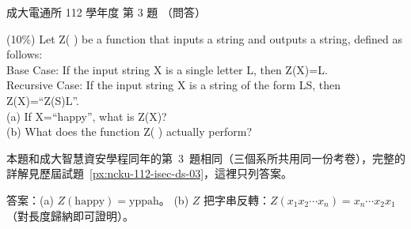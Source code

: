 \begin{pastexam}[label={px:ncku-112-cce-ds-03}]{成大電通所 112 學年度 第 3 題}
（問答）

(10\%) Let Z( ) be a function that inputs a string and outputs a string, defined as follows:\\
\hspace*{2em}Base Case: If the input string X is a single letter L, then Z(X)=L.\\
\hspace*{2em}Recursive Case: If the input string X is a string of the form LS, then Z(X)=``Z(S)L''.\\
\hspace*{2em}(a) If X=``happy'', what is Z(X)?\\
\hspace*{2em}(b) What does the function Z( ) actually perform?
\end{pastexam}

\begin{pastsoln}
本題和成大智慧資安學程同年的第~3~題相同（三個系所共用同一份考卷），完整的詳解見歷屆試題~\ref{px:ncku-112-isec-ds-03}，這裡只列答案。

答案：(a) $Z(\text{happy}) = \text{yppah}$。 (b) $Z$ 把字串反轉：$Z(x_1 x_2 \cdots x_n) = x_n \cdots x_2 x_1$（對長度歸納即可證明）。
\end{pastsoln}
